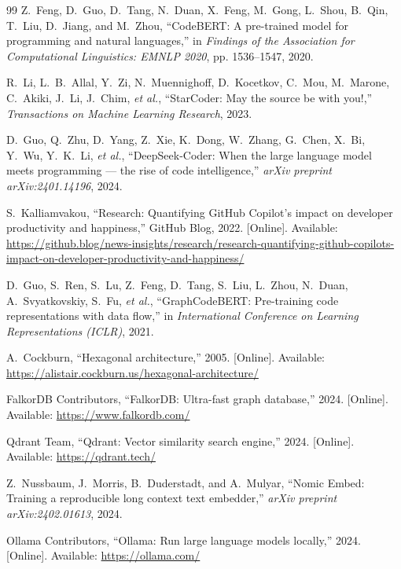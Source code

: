 \documentclass[12pt,a4paper,oneside]{report}
\begin{document}
\begin{thebibliography}{99}
Z.~Feng, D.~Guo, D.~Tang, N.~Duan, X.~Feng, M.~Gong, L.~Shou, B.~Qin, T.~Liu, D.~Jiang, and M.~Zhou, ``CodeBERT: A pre-trained model for programming and natural languages,'' in \textit{Findings of the Association for Computational Linguistics: EMNLP 2020}, pp. 1536--1547, 2020.

R.~Li, L.~B.~Allal, Y.~Zi, N.~Muennighoff, D.~Kocetkov, C.~Mou, M.~Marone, C.~Akiki, J.~Li, J.~Chim, \textit{et al.}, ``StarCoder: May the source be with you!,'' \textit{Transactions on Machine Learning Research}, 2023.

D.~Guo, Q.~Zhu, D.~Yang, Z.~Xie, K.~Dong, W.~Zhang, G.~Chen, X.~Bi, Y.~Wu, Y.~K.~Li, \textit{et al.}, ``DeepSeek-Coder: When the large language model meets programming --- the rise of code intelligence,'' \textit{arXiv preprint arXiv:2401.14196}, 2024.

S.~Kalliamvakou, ``Research: Quantifying GitHub Copilot's impact on developer productivity and happiness,'' GitHub Blog, 2022. [Online]. Available: \url{https://github.blog/news-insights/research/research-quantifying-github-copilots-impact-on-developer-productivity-and-happiness/}

D.~Guo, S.~Ren, S.~Lu, Z.~Feng, D.~Tang, S.~Liu, L.~Zhou, N.~Duan, A.~Svyatkovskiy, S.~Fu, \textit{et al.}, ``GraphCodeBERT: Pre-training code representations with data flow,'' in \textit{International Conference on Learning Representations (ICLR)}, 2021.

A.~Cockburn, ``Hexagonal architecture,'' 2005. [Online]. Available: \url{https://alistair.cockburn.us/hexagonal-architecture/}



FalkorDB Contributors, ``FalkorDB: Ultra-fast graph database,'' 2024. [Online]. Available: \url{https://www.falkordb.com/}

Qdrant Team, ``Qdrant: Vector similarity search engine,'' 2024. [Online]. Available: \url{https://qdrant.tech/}

Z.~Nussbaum, J.~Morris, B.~Duderstadt, and A.~Mulyar, ``Nomic Embed: Training a reproducible long context text embedder,'' \textit{arXiv preprint arXiv:2402.01613}, 2024.

Ollama Contributors, ``Ollama: Run large language models locally,'' 2024. [Online]. Available: \url{https://ollama.com/}




\end{thebibliography}
\end{document}
